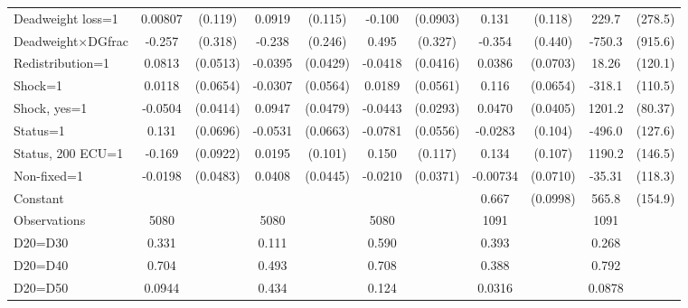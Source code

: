 \begin{tabular}{l|cccccc|cc|cc}
Deadweight loss=1&  0.00807         &  (0.119)&   0.0919         &  (0.115)&   -0.100         & (0.0903)&    0.131         &  (0.118)&    229.7         &  (278.5)\\
Deadweight$\times$\space{}DG\space{}frac&   -0.257         &  (0.318)&   -0.238         &  (0.246)&    0.495         &  (0.327)&   -0.354         &  (0.440)&   -750.3         &  (915.6)\\
Redistribution=1&   0.0813         & (0.0513)&  -0.0395         & (0.0429)&  -0.0418         & (0.0416)&   0.0386         & (0.0703)&    18.26         &  (120.1)\\
Shock=1         &   0.0118         & (0.0654)&  -0.0307         & (0.0564)&   0.0189         & (0.0561)&    0.116\sym{*}  & (0.0654)&   -318.1\sym{***}&  (110.5)\\
Shock, yes=1    &  -0.0504         & (0.0414)&   0.0947\sym{**} & (0.0479)&  -0.0443         & (0.0293)&   0.0470         & (0.0405)&   1201.2\sym{***}&  (80.37)\\
Status=1        &    0.131\sym{*}  & (0.0696)&  -0.0531         & (0.0663)&  -0.0781         & (0.0556)&  -0.0283         &  (0.104)&   -496.0\sym{***}&  (127.6)\\
Status, 200 ECU=1&   -0.169\sym{*}  & (0.0922)&   0.0195         &  (0.101)&    0.150         &  (0.117)&    0.134         &  (0.107)&   1190.2\sym{***}&  (146.5)\\
Non-fixed=1     &  -0.0198         & (0.0483)&   0.0408         & (0.0445)&  -0.0210         & (0.0371)& -0.00734         & (0.0710)&   -35.31         &  (118.3)\\
Constant        &                  &         &                  &         &                  &         &    0.667\sym{***}& (0.0998)&    565.8\sym{***}&  (154.9)\\
\hline
Observations    &     5080         &         &     5080         &         &     5080         &         &     1091         &         &     1091         &         \\
D20=D30         &    0.331         &         &    0.111         &         &    0.590         &         &    0.393         &         &    0.268         &         \\
D20=D40         &    0.704         &         &    0.493         &         &    0.708         &         &    0.388         &         &    0.792         &         \\
D20=D50         &   0.0944         &         &    0.434         &         &    0.124         &         &   0.0316         &         &   0.0878         &         \\

\end{tabular}
